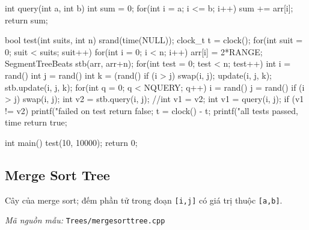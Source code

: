 \documentclass[11pt]{article}
\newcommand{\codepath}[1]{\par\noindent\textit{Mã nguồn mẫu:} \texttt{#1}\par}
\begin{document}
\begin{vncode}
int query(int a, int b) {
	int sum = 0;
	for(int i = a; i <= b; i++) sum += arr[i];
	return sum;
}

bool test(int suits, int n) {
	srand(time(NULL));
	clock_t t = clock();
	for(int suit = 0; suit < suits; suit++) {
		for(int i = 0; i < n; i++) arr[i] = 2*RANGE;
		SegmentTreeBeats stb(arr, arr+n);
		for(int test = 0; test < n; test++) {
			int i = rand()%
			int j = rand()%
			int k = (rand()%
			if (i > j) swap(i, j);
			update(i, j, k);
			stb.update(i, j, k);
			for(int q = 0; q < NQUERY; q++) {
				i = rand()%
				j = rand()%
				if (i > j) swap(i, j);
				int v2 = stb.query(i, j);
				//int v1 = v2;
				int v1 = query(i, j);
				if (v1 != v2) {
					printf("failed on test %
					return false;
				}
			}
		}
	}
	t = clock() - t;
	printf("all tests passed, time %
	return true;
}

int main() {
	test(10, 10000);
	return 0;
}
\end{vncode}
\endgroup


\subsection{Merge Sort Tree}

Cây của merge sort; đếm phần tử trong đoạn \texttt{[i,j]} có giá trị thuộc \texttt{[a,b]}.

\codepath{Trees/mergesorttree.cpp}
\end{document}
